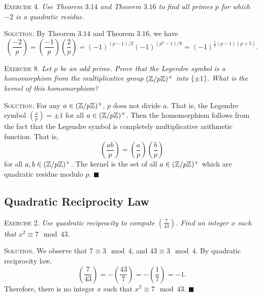 \documentclass[11pt, leqno]{article}
\newcommand{\done}{\ensuremath{\blacksquare}}
\begin{document}
\textsc{Exercise 4}. \emph{Use Theorem $3.14$ and Theorem $3.16$ to find all primes $p$ for which $-2$ is a quadratic residue.}

\textsc{Solution}. By Theorem $3.14$ and Theorem $3.16$, we have 
\begin{displaymath}
\left( \frac{-2}{p} \right) = \left( \frac{-1}{p} \right) \left( \frac{2}{p} \right) = (-1)^{(p-1)/2}(-1)^{(p^2-1)/8} = (-1)^{\frac{1}{8}(p-1)(p+5)}.
\end{displaymath}



\textsc{Exercise 8}. \emph{Let $p$ be an odd prime. Prove that the Legendre symbol is a homomorphism from the multiplicative group $(\mathbb{Z}/p\mathbb{Z})^{\times}$ into $\{\pm 1\}$. What is the kernel of this homomorphism?}

\textsc{Solution}. For any $a\in (\mathbb{Z}/p\mathbb{Z})^{\times}$, $p$ does not divide $a$. That is, the Legendre symbol $\left( \frac{a}{p} \right) = \pm 1$ for all $a\in (\mathbb{Z}/p\mathbb{Z})^{\times}$. Then the homomorphism follows from the fact that the Legendre symbol is completely multiplicative arithmetic function. That is, 
\begin{displaymath}
\left( \frac{ab}{p} \right) = \left( \frac{a}{p} \right) \left( \frac{b}{p} \right)
\end{displaymath}
for all $a,b \in (\mathbb{Z}/p\mathbb{Z})^{\times}$. The kernel is the set of all $a\in (\mathbb{Z}/p\mathbb{Z})^{\times}$ which are quadratic residue modulo $p$. \done

\subsection{Quadratic Reciprocity Law}

\textsc{Exercise 2}. \emph{Use quadratic reciprocity to compute $\left( \frac{7}{43} \right)$. Find an integer $x$ such that $x^2 \equiv 7 \mod 43$.}

\textsc{Solution}. We observe that $7 \equiv 3 \mod 4$, and $43 \equiv 3 \mod 4$. By quadratic reciprocity law, 
\begin{displaymath}
\left( \frac{7}{43} \right) = -\left( \frac{43}{7} \right) = -\left( \frac{1}{7} \right) = -1.
\end{displaymath}
Therefore, there is no integer $x$ such that $x^2 \equiv 7 \mod 43$. \done
\end{document}
